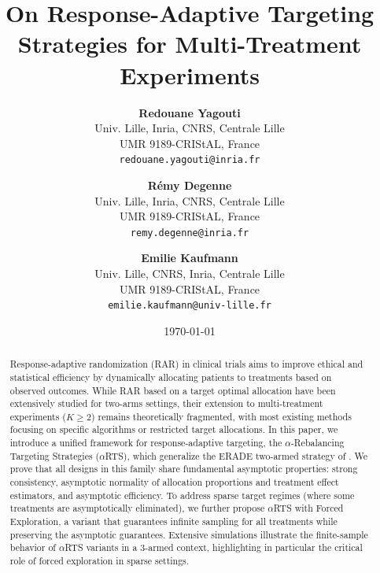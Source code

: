 \documentclass[11pt]{article}
\title{On Response-Adaptive Targeting Strategies for Multi-Treatment Experiments}
\author{
	\textbf{Redouane Yagouti}\\
	Univ. Lille, Inria,  CNRS, Centrale Lille\\ 
	UMR 9189-CRIStAL, France\\
	\texttt{redouane.yagouti@inria.fr}
	\and
	\textbf{Rémy Degenne}\\
	Univ. Lille, Inria,  CNRS, Centrale Lille\\ 
	UMR 9189-CRIStAL, France\\
	\texttt{remy.degenne@inria.fr}
	\and
	\textbf{Emilie Kaufmann}\\
	Univ. Lille, CNRS, Inria,  Centrale Lille\\
	UMR 9189-CRIStAL, France\\
	\texttt{emilie.kaufmann@univ-lille.fr}
}
\date{\today}
\theoremstyle{plain}
\theoremstyle{definition}
\begin{document}
	
	\maketitle
	
	\begin{abstract}		

Response-adaptive randomization (RAR) in clinical trials aims to improve ethical and statistical efficiency by dynamically allocating patients to treatments based on observed outcomes. While RAR based on a target optimal allocation have been extensively studied for two-arms settings, their extension to multi-treatment experiments ($K \geq 2$) remains theoretically fragmented, with most existing methods focusing on specific algorithms or restricted target allocations.
In this paper, we introduce a unified framework for response-adaptive targeting, the $\alpha$-Rebalancing Targeting Strategies ($\alpha$RTS), which generalize the ERADE two-armed strategy of \cite{hu2009efficient}. We prove that all designs in this family share fundamental asymptotic properties: strong consistency, asymptotic normality of allocation proportions and treatment effect estimators, and asymptotic efficiency. To address sparse target regimes (where some treatments are asymptotically eliminated), we further propose $\alpha$RTS with Forced Exploration, a variant that guarantees infinite sampling for all treatments while preserving the asymptotic guarantees.
Extensive simulations illustrate the finite-sample behavior of $\alpha$RTS variants in a 3-armed context, highlighting in particular the critical role of forced exploration in sparse settings.



\end{abstract}
\end{document}
